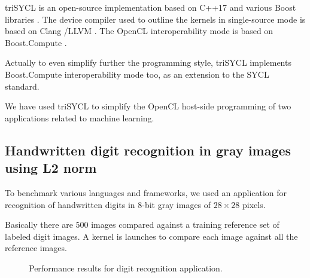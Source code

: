 \documentclass[sigplan, review]{acmart}
\begin{document}
triSYCL \cite{triSYCL} is an open-source implementation based on C++17
and various Boost libraries \cite{Boost-1.63}. The device compiler used to
outline the kernels in single-source mode is based on Clang
\cite{Clang-4.0}/LLVM \cite{LLVM-4.0}. The OpenCL interoperability mode is
based on Boost.Compute \cite{Boost.Compute}.

Actually to even simplify further the programming style, triSYCL
implements Boost.Compute interoperability mode too, as an extension to
the SYCL standard.

We have used triSYCL to simplify the OpenCL host-side programming of
two applications related to machine learning.


\subsection{Handwritten digit recognition in gray images using L2
  norm}
\label{sec:example-from-anast}

To benchmark various languages and frameworks, we used an application
for recognition of handwritten digits in 8-bit gray images of
$28 \times 28$ pixels.

Basically there are 500 images compared against a training reference
set of labeled digit images. A kernel is launches to compare each
image against all the reference images.

\begin{figure}
  \caption{Performance results for digit recognition application.}
  \label{fig:results-digit-recognition}
\end{figure}
\end{document}
